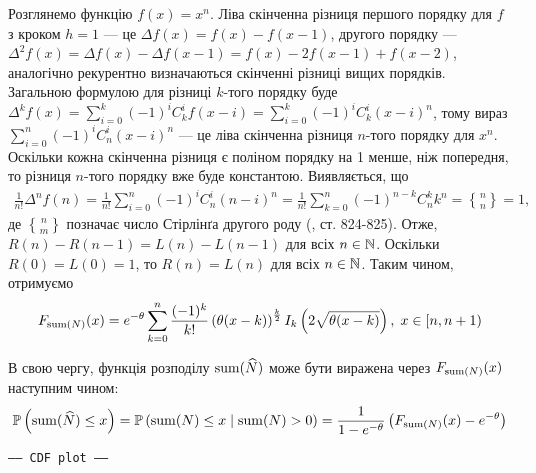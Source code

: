 Розглянемо функцію $f(x) = x^n$.
Ліва скінченна різниця першого порядку для $f$ з кроком $h=1$ --- це 
$\Delta f(x) = f(x) - f(x-1)$, другого порядку --- $\Delta^2 f(x) = \Delta f(x) - \Delta f(x-1) = 
f(x) - 2f(x-1) + f(x-2)$,
аналогічно рекурентно визначаються скінченні різниці вищих порядків.
Загальною формулою для різниці $k$-того порядку буде
$\Delta^k f(x) = \sum_{i=0}^k (-1)^i C_k^i f(x-i) = \sum_{i=0}^k (-1)^i C_k^i (x - i)^n$,
тому вираз $\sum_{i=0}^n (-1)^i C_n^i (x-i)^n$ --- це ліва скінченна різниця $n$-того порядку для
$x^n$. Оскільки кожна скінченна різниця є поліном порядку на 1 менше, ніж попередня,
то різниця $n$-того порядку вже буде константою. Виявляється,
що
\begin{gather*}
    \frac{1}{n!} \Delta^n f(n) = 
    \frac{1}{n!} \sum_{i=0}^n (-1)^i C_n^i (n - i)^n = 
    \frac{1}{n!} \sum_{k=0}^n (-1)^{n-k} C_n^k k^n = {n\brace n} = 1,
\end{gather*}
де ${n \brace m}$ позначає число Стірлінґа другого роду (\cite{Abramowitz_Stegun}, ст. 824-825).
Отже, $R(n) - R(n-1) = L(n) - L(n-1)$ для всіх $n \in \mathbb{N}$. Оскільки
$R(0) = L(0) = 1$, то $R(n) = L(n)$ для всіх $n \in \mathbb{N}$.
Таким чином, отримуємо 
\begin{gather}
    F_{\operatorname{sum}(N)}(x) = e^{-\theta}
    \sum_{k=0}^{n} \frac{(-1)^k}{k!}
    \left(\theta (x - k)\right)^{\frac{k}{2}} I_k\left(2\sqrt{\theta(x-k)}\right), \; x \in [n, n+1)
\end{gather}

В свою чергу, функція розподілу $\operatorname{sum}(\widehat{N})$ 
може бути виражена через $F_{\operatorname{sum}(N)}(x)$ наступним чином:
\begin{equation}
    \mathbb{P}\left(\operatorname{sum}(\widehat{N}) \leq x\right) = \mathbb{P}\left(\operatorname{sum}(N) \leq x \mid \operatorname{sum}(N) > 0\right) = \frac{1}{1-e^{-\theta}} \left(F_{\operatorname{sum}(N)}(x) - e^{-\theta}\right)
\end{equation}
\begin{center}
    \texttt{----- CDF plot -----}
\end{center}

